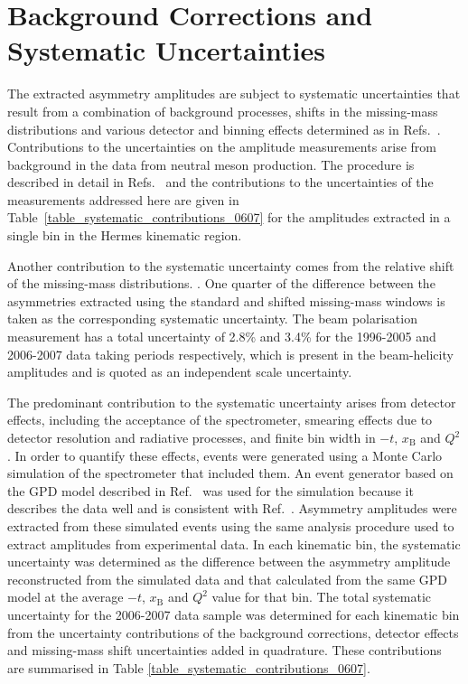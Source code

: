\section{Background Corrections and Systematic Uncertainties}
The extracted asymmetry amplitudes are subject to systematic uncertainties that
result from a combination of background processes, 
shifts in the missing-mass distributions and various detector and binning
effects determined as in Refs.~\cite{Air08,Air09}. Contributions to the uncertainties on the amplitude measurements arise from background in the data from neutral meson production. The procedure is described in detail in Refs.~\cite{Air08,Air09} and the contributions to the uncertainties of the measurements addressed here are given in Table~\ref{table_systematic_contributions_0607} for the amplitudes extracted in a single bin in the H{\sc ermes} kinematic region. 

Another contribution to the systematic uncertainty comes from the relative shift of the
missing-mass distributions. .  One
quarter of the difference between the asymmetries extracted using the standard
and shifted missing-mass windows is taken as the corresponding systematic
uncertainty. The beam polarisation measurement has a total uncertainty of 2.8\% and 3.4\% for the 1996-2005 and 2006-2007 data taking periods respectively,
which is present in the beam-helicity amplitudes and is quoted as an
independent scale uncertainty.

The predominant contribution to the systematic uncertainty arises from detector
effects, including the acceptance of the spectrometer, smearing effects due to detector resolution and radiative processes, and
finite bin width in $-t$, $x_{\textrm{B}}$ and $Q^{2}$. In order to quantify
these effects, events were generated using a Monte Carlo simulation of
the spectrometer that included them. An event
generator based on the GPD model described in Ref.~\cite{Guz06} was used for the simulation because it describes the data well and is consistent with Ref.~\cite{Air09}. Asymmetry amplitudes were extracted from these simulated events using the same analysis
procedure used to extract amplitudes from experimental data. In each kinematic
bin, the systematic uncertainty was determined as the difference between the
asymmetry amplitude reconstructed from the simulated data and that
calculated from the same GPD model at the average $-t$, $x_{\textrm{B}}$ and
$Q^{2}$ value for that bin.
The total systematic uncertainty for the 2006-2007 data sample was
determined for each kinematic bin from the uncertainty contributions of the
background corrections, detector effects and missing-mass shift
uncertainties added in quadrature. 
These contributions are summarised in Table
\ref{table_systematic_contributions_0607}.

